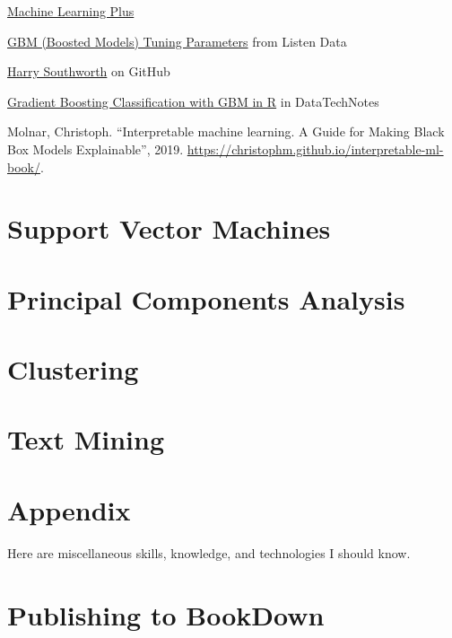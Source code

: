 \documentclass[]{book}
\begin{document}
\href{https://www.machinelearningplus.com/machine-learning/caret-package/}{Machine Learning Plus}

\href{https://www.listendata.com/2015/07/gbm-boosted-models-tuning-parameters.html}{GBM (Boosted Models) Tuning Parameters} from Listen Data

\href{https://github.com/harrysouthworth/gbm/blob/master/demo/bernoulli.R}{Harry Southworth} on GitHub

\href{https://www.datatechnotes.com/2018/03/classification-with-gradient-boosting.html}{Gradient Boosting Classification with GBM in R} in DataTechNotes

Molnar, Christoph. ``Interpretable machine learning. A Guide for Making Black Box Models Explainable'', 2019. \url{https://christophm.github.io/interpretable-ml-book/}.

\hypertarget{support-vector-machines}{%
\chapter{Support Vector Machines}\label{support-vector-machines}}

\hypertarget{principal-components-analysis}{%
\chapter{Principal Components Analysis}\label{principal-components-analysis}}

\hypertarget{clustering}{%
\chapter{Clustering}\label{clustering}}

\hypertarget{text-mining}{%
\chapter{Text Mining}\label{text-mining}}

\hypertarget{appendix}{%
\chapter*{Appendix}\label{appendix}}

Here are miscellaneous skills, knowledge, and technologies I should know.

\hypertarget{publishing-to-bookdown}{%
\chapter*{Publishing to BookDown}\label{publishing-to-bookdown}}
\end{document}
